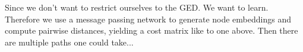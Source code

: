 

Since we don't want to restrict ourselves to the GED. We want to learn. Therefore we use a message passing network to generate node embeddings and compute pairwise distances, yielding a cost matrix like to one above. Then there are multiple paths one could take...








